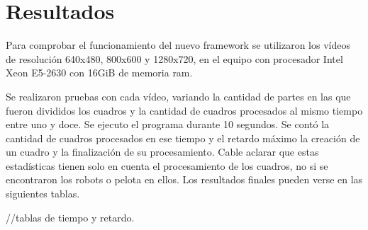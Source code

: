 
\section{Resultados}

Para comprobar el funcionamiento del nuevo framework se utilizaron los vídeos de
resolución 640x480, 800x600 y 1280x720, en el equipo con procesador Intel Xeon
E5-2630 con 16GiB de memoria ram.

Se realizaron pruebas con cada vídeo, variando la cantidad de partes en las que
fueron divididos los cuadros y la cantidad de cuadros procesados al mismo tiempo
entre uno y doce. Se ejecuto el programa durante 10 segundos. Se contó la
cantidad de cuadros procesados en ese tiempo y el retardo máximo la creación de
un cuadro y la finalización de su procesamiento. Cable aclarar que estas
estadísticas tienen solo en cuenta el procesamiento de los cuadros, no si se
encontraron los robots o pelota en ellos. Los resultados finales pueden verse
en las siguientes tablas.

//tablas de tiempo y retardo.


